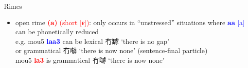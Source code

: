 \documentclass{beamer}
\begin{document}
\begin{frame}[fragile]{Rimes}

\begin{itemize}
    \item open rime \textcolor{red}{\textbf{(a)} (short [ɐ])}: only occurs in \enquote{unstressed} situations where \textcolor{blue}{\textbf{aa} [a]} can be phonetically reduced\\
    e.g. mou5 \textcolor{blue}{\textbf{laa3}} can be lexical 冇罅 \enquote*{there is no gap}\\ or grammatical 冇嚹 \enquote*{there is now none} {\scriptsize (sentence-final particle)}\\
    \smallskip
    mou5 \textcolor{red}{\textbf{la3}} is grammatical 冇嚹 \enquote*{there is now none}
\end{itemize}

\end{frame}
\end{document}
